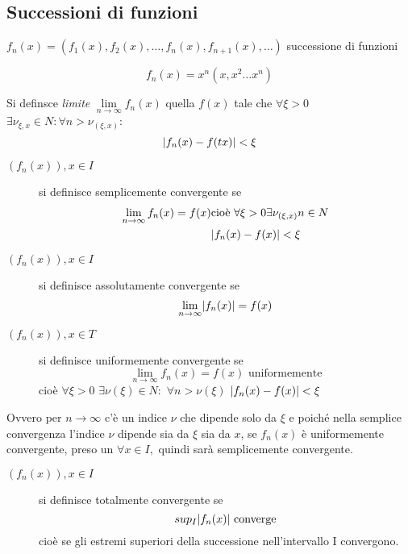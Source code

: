 \subsection{Successioni di funzioni}
$f_n(x)=(f_1(x),f_2(x),\dots,f_n(x),f_{n+1}(x),\dots)$ {\color{red}successione di
  funzioni}
\begin{esempio}
  \begin{equation*}
    f_n(x)=x^n(x,x^2\dots x^n)
  \end{equation*}
\end{esempio}
Si definsce \textit{\color{red}limite} $\lim\limits_{n\to\infty}f_n(x)$ quella $f(x)$ tale
che $\forall \xi >0$ $\exists \nu_{\xi,x}\in N:\forall n >\nu_{(\xi,x)}$:
\begin{equation*}
  \lvert f_n(x)-f(tx)\rvert<\xi
\end{equation*}
\begin{description}
\item[$(f_n(x)),x\in I$] si definisce {\color{red}semplicemente convergente} se
  \begin{eqnarray*}
    \lim\limits_{n\to \infty}f_n(x)=f(x) & \text{cioè } \forall \xi > 0 \exists
                                           \nu_{(\xi,x)} n\in N\\
    & \lvert f_n(x)-f(x)\rvert<\xi
  \end{eqnarray*}
\item[$(f_n(x)), x\in I$] si definisce {\color{red}assolutamente convergente} se
  \begin{equation*}
    \lim\limits_{n\to \infty}\lvert f_n(x)\rvert=f(x)
  \end{equation*}
\item[$(f_n(x)),x\in T$] si definisce {\color{red}uniformemente convergente} se
  \begin{equation*}
    \lim\limits_{n\to \infty}f_n(x)=f(x) \text{ uniformemente}
  \end{equation*}
  cioè $\forall\xi >0$ $\exists \nu (\xi) \in N:$ $\forall n > \nu (\xi)$
  $\lvert f_n(x)-f(x)\rvert<\xi$
\end{description}
Ovvero per $n\to \infty$ c'è un indice $\nu$ che dipende solo da $\xi$ e poiché nella
semplice convergenza l'indice $\nu$ dipende sia da $\xi$ sia da $x$, se $f_n(x)$ è
uniformemente convergente, preso un $\forall x\in I,$ quindi sarà semplicemente
convergente.
\begin{description}
\item[$(f_n(x)),x\in I$] si definisce {\color{red}totalmente convergente} se
  \begin{equation*}
    sup_I\lvert f_n(x)\rvert \text{ converge}
  \end{equation*}
  cioè se gli estremi superiori della successione nell'intervallo I convergono.
\end{description}
